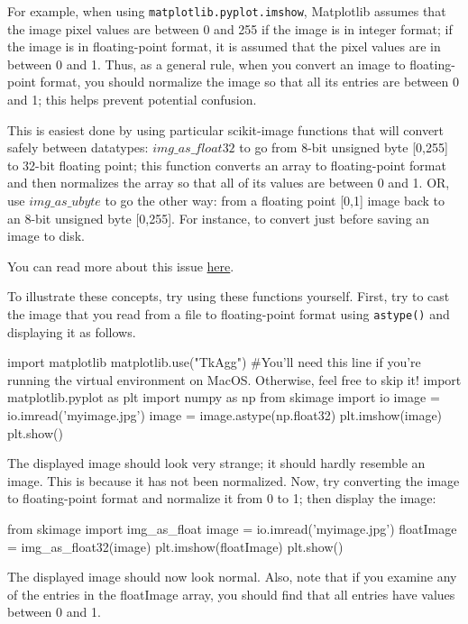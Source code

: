 \documentclass{article}
\begin{document}
For example, when using \texttt{matplotlib.pyplot.imshow}, Matplotlib assumes that the image pixel values are between 0 and 255 if the image is in integer format; if the image is in floating-point format, it is assumed that the pixel values are in between 0 and 1. Thus, as a general rule, when you convert an image to floating-point format, you should normalize the image so that all its entries are between 0 and 1; this helps prevent potential confusion.

This is easiest done by using particular scikit-image functions that will convert safely between datatypes:
\href{http://scikit-image.org/docs/dev/api/skimage.html#skimage.img_as_float32}{$img\_as\_float32$} to go from 8-bit unsigned byte [0,255] to 32-bit floating point; this function converts an array to floating-point format and then normalizes the array so that all of its values are between 0 and 1. OR, use \href{http://scikit-image.org/docs/dev/api/skimage.html#skimage.img_as_ubyte}{$img\_as\_ubyte$} to go the other way: from a floating point [0,1] image back to an 8-bit unsigned byte [0,255]. For instance, to convert just before saving an image to disk.

You can read more about this issue \href{http://scikit-image.org/docs/dev/user_guide/data_types.html}{here}.

To illustrate these concepts, try using these functions yourself.
First, try to cast the image that you read from a file to floating-point format using \texttt{astype()} and displaying it as follows.\\
\begin{python}
import matplotlib
matplotlib.use("TkAgg") #You'll need this line if you're running the virtual environment on MacOS. Otherwise, feel free to skip it!
import matplotlib.pyplot as plt
import numpy as np
from skimage import io
image = io.imread('myimage.jpg')
image = image.astype(np.float32)
plt.imshow(image)
plt.show()
\end{python}

The displayed image should look very strange; it should hardly resemble an image. This is because it has not been normalized.
Now, try converting the image to floating-point format and normalize it from 0 to 1; then display the image:
\begin{python}
from skimage import img_as_float
image = io.imread('myimage.jpg')
floatImage = img_as_float32(image)
plt.imshow(floatImage)
plt.show()
\end{python}

The displayed image should now look normal. Also, note that if you examine any of the entries in the floatImage array, you should find that all entries have values between 0 and 1.
\end{document}

